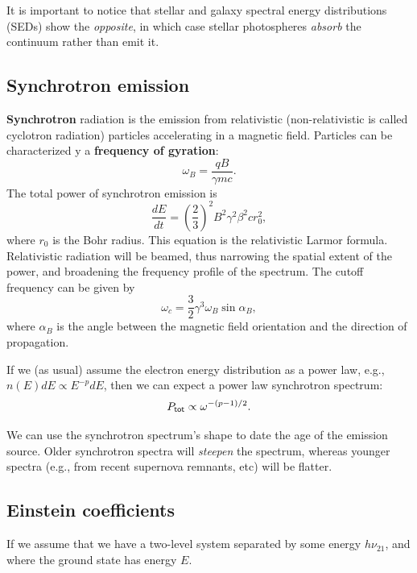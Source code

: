 \documentclass{tufte-handout}
\renewcommand{\textbf}[1]{{\bf \textcolor{dark-gray}{#1}}}
\renewcommand{\rm}{\sf}
\begin{document}
It is important to notice that stellar and galaxy spectral energy distributions (SEDs) show the \textit{opposite}, in which case stellar photospheres \textit{absorb} the continuum rather than emit it.

\subsection{Synchrotron emission}

\textbf{Synchrotron} radiation is the emission from relativistic (non-relativistic is called cyclotron radiation) particles accelerating in a magnetic field. Particles can be characterized y a \textbf{frequency of gyration}:
\begin{equation}
\omega_B = \frac{qB}{\gamma mc}.
\end{equation}
The total power of synchrotron emission is
\begin{equation}
\frac{dE}{dt} = \left (\frac{2}{3}\right )^2 B^2 \gamma^2 \beta^2 c r_0^2,
\end{equation}
where $r_0$ is the Bohr radius. This equation is the relativistic Larmor formula. Relativistic radiation will be beamed, thus narrowing the spatial extent of the power, and broadening the frequency profile of the spectrum. The cutoff frequency can be given by
\begin{equation}
\omega_c = \frac{3}{2} \gamma^3 \omega_B \sin \alpha_B,
\end{equation}
where $\alpha_B$ is the angle between the magnetic field orientation and the direction of propagation.

If we (as usual) assume the electron energy distribution as a power law, e.g., $n(E) dE \propto E^{-p} dE$, then we can expect a power law synchrotron spectrum:
\begin{equation}
P_{\rm tot} \propto \omega^{-(p-1)/2}.
\end{equation}

We can use the synchrotron spectrum's shape to date the age of the emission source. Older synchrotron spectra will \textit{steepen} the spectrum, whereas younger spectra (e.g., from recent supernova remnants, etc) will be flatter.

\subsection{Einstein coefficients}
If we assume that we have a two-level system separated by some energy $h\nu_{21}$, and where the ground state has energy $E$. 
\end{document}
